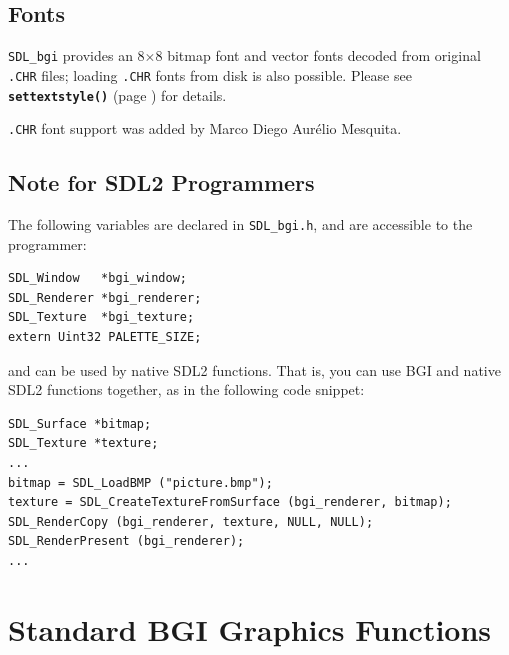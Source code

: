 \documentclass[a4paper,12pt]{article}
\newcommand{\func}[1]{\textbf{\texttt{#1}}}  %
\newcommand{\F}[1]{\texttt{#1}}     %
\newcommand{\T}[1]{\texttt{#1}}     %
\newcommand{\SDLbgi}{\texttt{SDL\_bgi}}
\begin{document}

\subsection{Fonts}

\SDLbgi{} provides an 8$\times$8 bitmap font and vector fonts decoded
from original \T{.CHR} files; loading \T{.CHR} fonts from disk is also
possible. Please see \func{settextstyle()} (page
\pageref{sec:settextstyle}) for details.

\T{.CHR} font support was added by Marco Diego Aur\'elio Mesquita.



\subsection{Note for SDL2 Programmers}

The following variables are declared in \F{SDL\_bgi.h}, and are
accessible to the programmer:

\begin{small}
\begin{spacing}{0.85}
\begin{verbatim}
SDL_Window   *bgi_window;
SDL_Renderer *bgi_renderer;
SDL_Texture  *bgi_texture;
extern Uint32 PALETTE_SIZE;
\end{verbatim}
\end{spacing}
\end{small}

and can be used by native SDL2 functions. That is, you can use BGI and
native SDL2 functions together, as in the following code snippet:

\begin{small}
\begin{spacing}{0.85}
\begin{verbatim}
SDL_Surface *bitmap;
SDL_Texture *texture;
...
bitmap = SDL_LoadBMP ("picture.bmp");
texture = SDL_CreateTextureFromSurface (bgi_renderer, bitmap);
SDL_RenderCopy (bgi_renderer, texture, NULL, NULL);
SDL_RenderPresent (bgi_renderer);
...
\end{verbatim}
\end{spacing}
\end{small}


\section{Standard BGI Graphics Functions}
\end{document}
